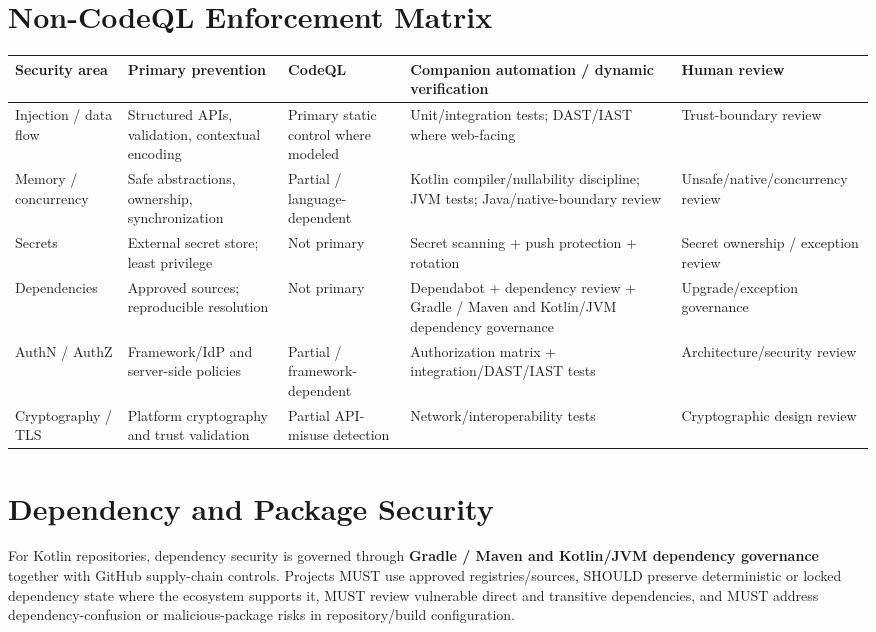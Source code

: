 \documentclass[10pt,letterpaper]{article}
\begin{document}
\section{Non-CodeQL Enforcement Matrix}
\begin{tabularx}{\textwidth}{@{}P{1.10in}Y P{1.00in} P{1.65in} P{1.00in}@{}}
\toprule
\textbf{Security area} & \textbf{Primary prevention} & \textbf{CodeQL} & \textbf{Companion automation / dynamic verification} & \textbf{Human review}\\
\midrule
Injection / data flow & Structured APIs, validation, contextual encoding & Primary static control where modeled & Unit/\allowbreak integration tests; DAST/\allowbreak IAST where web-facing & Trust-boundary review\\
Memory / concurrency & Safe abstractions, ownership, synchronization & Partial / language-dependent & Kotlin compiler/\allowbreak nullability discipline; JVM tests; Java/\allowbreak native-boundary review & Unsafe/\allowbreak native/\allowbreak concurrency review\\
Secrets & External secret store; least privilege & Not primary & Secret scanning + push protection + rotation & Secret ownership / exception review\\
Dependencies & Approved sources; reproducible resolution & Not primary & Dependabot + dependency review + Gradle / Maven and Kotlin/\allowbreak JVM dependency governance & Upgrade/\allowbreak exception governance\\
AuthN / AuthZ & Framework/\allowbreak IdP and server-side policies & Partial / framework-dependent & Authorization matrix + integration/\allowbreak DAST/\allowbreak IAST tests & Architecture/\allowbreak security review\\
Cryptography / TLS & Platform cryptography and trust validation & Partial API-misuse detection & Network/\allowbreak interoperability tests & Cryptographic design review\\
\bottomrule
\end{tabularx}

\section{Dependency and Package Security}
For Kotlin repositories, dependency security is governed through \textbf{Gradle / Maven and Kotlin/JVM dependency governance} together with GitHub supply-chain controls. Projects MUST use approved registries/sources, SHOULD preserve deterministic or locked dependency state where the ecosystem supports it, MUST review vulnerable direct and transitive dependencies, and MUST address dependency-confusion or malicious-package risks in repository/build configuration.
\end{document}
